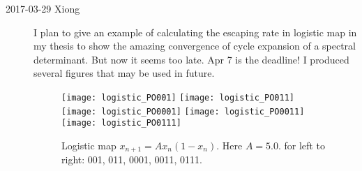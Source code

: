 \begin{description}
\item[2017-03-29 Xiong]
I plan to give an example of calculating the escaping rate in logistic 
map in my thesis to show the amazing convergence of cycle expansion of
a spectral determinant. But now it seems too late. Apr 7 is the 
deadline!  I produced several figures that may be used in future.
\begin{figure}[!ht]
  \centering
  \texttt{[image: logistic\_PO001]}
  \texttt{[image: logistic\_PO011]}
  \texttt{[image: logistic\_PO0001]}
  \texttt{[image: logistic\_PO0011]}
  \texttt{[image: logistic\_PO0111]}
  \caption{Logistic map $x_{n+1} = Ax_n(1-x_n)$. Here $A=5.0$. 
    for left to right: 001, 011, 0001, 0011, 0111.
  }
  \label{fig:logisticMapPOs}
\end{figure}

\end{description}

\renewcommand{\ssp}{a}

